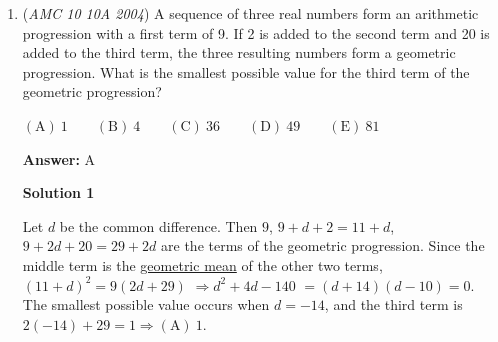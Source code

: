 \begin{enumerate}
 $\mathrm{(A) \ } 250 \qquad \mathrm{(B) \ } 300 \qquad \mathrm{(C) \ } 350 \qquad \mathrm{(D) \ }  400\qquad \mathrm{(E) \ } 500$

 \textbf{Answer: }C



\textbf{Solution 1}

Call the length of the race track $x$. When they meet at the first meeting point, Brenda has run $100$ meters, while Sally has run $\frac{x}{2} - 100$ meters. By the second meeting point, Sally has run $150$ meters, while Brenda has run $x - 150$ meters. Since they run at a constant speed, we can set up a \href{https://artofproblemsolving.com/wiki/index.php?title=Proportion}{proportion}: $\frac{100}{x- 150} = \frac{\frac{x}{2} - 100}{150}$. Cross-multiplying, we get that $x = 350\Longrightarrow\boxed{\mathrm{(C)}\ 350}$.

 



\textbf{Solution 2}

The total distance the girls run between the start and the first meeting is one half of the track length. The total distance they run between the two meetings is the track length. As the girls run at constant speeds, the interval between the meetings is twice as long as the interval between the start and the first meeting. Thus between the meetings Brenda will run $2\times100=200$ meters. Therefore the length of the track is $150 + 200 = 350$ meters $\Rightarrow\boxed{\mathrm{(C)}\ 350}$

 Education, the Study of Everything

 


	\item (\textit{AMC 10 10A 2004}) A sequence of three real numbers form an arithmetic progression with a first term of 9.  If 2 is added to the second term and 20 is added to the third term, the three resulting numbers form a geometric progression.  What is the smallest possible value for the third term of the geometric progression?


 $\mathrm{(A) \ } 1 \qquad \mathrm{(B) \ } 4 \qquad \mathrm{(C) \ } 36 \qquad \mathrm{(D) \ } 49 \qquad \mathrm{(E) \ } 81$

 \textbf{Answer: }A



\textbf{Solution 1}

Let $d$ be the common difference. Then $9$, $9+d+2=11+d$, $9+2d+20=29+2d$ are the terms of the geometric progression. Since the middle term is the \href{https://artofproblemsolving.com/wiki/index.php?title=Geometric\_mean}{geometric mean} of the other two terms, $(11+d)^2 = 9(2d+29)$ $\Longrightarrow d^2 + 4d - 140$ $= (d+14)(d-10) = 0$. The smallest possible value occurs when $d = -14$, and the third term is $2(-14) + 29 = 1\Rightarrow\boxed{\mathrm{(A)}\ 1}$.


\end{enumerate}
